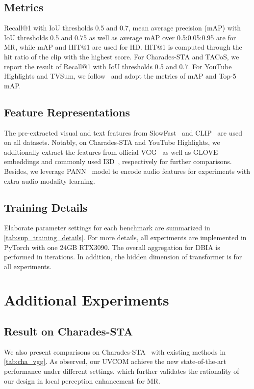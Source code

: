 \documentclass[10pt,twocolumn,letterpaper]{article}
\begin{document}
\subsection{Metrics}
\label{sup:metrics}
Recall@1 with IoU thresholds 0.5 and 0.7, mean average precision (mAP) with IoU thresholds 0.5 and 0.75 as well as average mAP over 0.5:0.05:0.95 are for MR, while mAP and HIT@1 are used for HD. HIT@1 is computed through the hit ratio of the clip with the highest score.
For Charades-STA and TACoS, we report the result of Recall@1 with IoU thresholds 0.5 and 0.7.
For YouTube Highlights and TVSum, we follow~\cite{umt} and adopt the metrics of mAP and Top-5 mAP.

\subsection{Feature Representations}
\label{sup:features}
The pre-extracted visual and text features from SlowFast~\cite{slowfast} and CLIP~\cite{clip} are used on all datasets.
Notably, on Charades-STA and YouTube Highlights, we additionally extract the features from official VGG~\cite{vgg} as well as GLOVE~\cite{glove} embeddings and commonly used I3D~\cite{i3d}, respectively for further comparisons. Besides, we leverage PANN~\cite{pann} model to encode audio features for experiments with extra audio modality learning.

\subsection{Training Details}
\label{sup:training details}
Elaborate parameter settings for each benchmark are summarized in \cref{tab:sup_training_details}. For more details,  
all experiments are implemented in PyTorch with one 24GB RTX3090.
The overall aggregation for DBIA is performed in  iterations. In addition, the hidden dimension of transformer is  for all experiments. 


\section{Additional Experiments}

\subsection{Result on Charades-STA}
\label{sup:result_cha_vgg}
We also present comparisons on Charades-STA~\cite{cha} with existing methods in \cref{tab:cha_vgg}. As observed, our UVCOM achieve the new state-of-the-art performance under different settings, which further validates the rationality of our design in local perception enhancement for MR.
\end{document}
